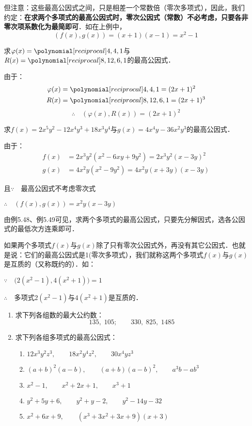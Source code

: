 但注意：这些最高公因式之间，只是相差一个常数倍（零次多项式），因此，我们约定：\textbf{在求两个多项式的最高公因式时，零次公因式（常数）不必考虑，只要各非零次项系数化为最简即可}．如在上例中，
\[(f(x),g(x))=(x+1)(x-1)=x^2-1\]
\begin{example}
求$\varphi(x)=\poly{4,4,1}$与$R(x)=\poly{8,12,6,1}$的最高公因式．
\end{example}

\begin{solution}
由于：\[\begin{split}
    \varphi(x)&=\poly{4,4,1}=(2x+1)^2\\
    R(x)&=\poly{8,12,6,1}=(2x+1)^3
\end{split}\]
\[\therefore\quad (\varphi(x), R(x))=(2x+1)^2\]
\end{solution}


\begin{example}
求$f(x)=2x^5y^2-12x^4y^3+18x^3y^4$与$g(x)=4x^4y-36x^2y^3$的最高公因式．
\end{example}

\begin{solution}
由于：\[\begin{split}
    f(x)&=2x^3y^2 (x^2-6xy+9y^2)=2x^3y^2(x-3y)^2\\
    g(x)&=4x^2y(x^2-9y^2)=4x^2y(x+3y)(x-3y)
\end{split}\]
\end{solution}
且$\because\quad $最高公因式不考虑零次式

$\therefore\quad (f(x),g(x))=x^2y(x-3y)$

由例5.48、例5.49可见，求两个多项式的最高公因式，只要先分解因式，选各公因式的最低次方连乘即可．

如果两个多项式$f(x)$与$g(x)$除了只有零次公因式外，再没有其它公因式．也就是说：它们的最高公因式是1(零次多项式），我们就称这两个多项式$f(x)$与$g(x)$是互质的（又称既约的）．如：

$\because\quad \big(2 (x^2-1) , 4 (x^2+1) \big) =1$

$\therefore\quad $多项式$2(x^2-1)$与$4(x^2+1)$是互质的．

\begin{ex}
\begin{enumerate}
    \item 求下列各组数的最大公约数：
    \[135,\; 105;\qquad 330,\; 825,\; 1485\]
    \item 求下列各组多项式的最高公因式：
\begin{enumerate}
    \item $12x^3y^2z^3,\qquad 18x^2y^4z^2,\qquad 30x^4yz^3$
    \item $(a+b)^2(a-b),\qquad (a+b)(a-b)^2,\qquad a^3b-ab^3$
    \item $x^2-1,\qquad x^2+2x+1,\qquad x^3+1$
    \item $y^2+5y+6,\qquad y^2+y-2,\qquad y^2-14y-32$
    \item $x^2+6x+9,\qquad (x^3+3x^2+3x+9)(x+3)$
\end{enumerate}
\end{enumerate}    
\end{ex}

